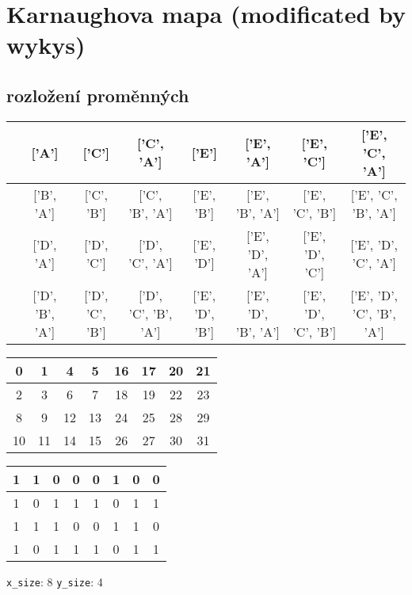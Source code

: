 \documentclass[a3paper]{article}
\begin{document}
\section{Karnaughova mapa (modificated by wykys)}
\subsection{rozložení proměnných}
\begin{tabular}[c]{| c | c | c | c | c | c | c | c |}

\hline
[]&['A']&['C']&['C', 'A']&['E']&['E', 'A']&['E', 'C']&['E', 'C', 'A']\\
\hline
['B']&['B', 'A']&['C', 'B']&['C', 'B', 'A']&['E', 'B']&['E', 'B', 'A']&['E', 'C', 'B']&['E', 'C', 'B', 'A']\\
\hline
['D']&['D', 'A']&['D', 'C']&['D', 'C', 'A']&['E', 'D']&['E', 'D', 'A']&['E', 'D', 'C']&['E', 'D', 'C', 'A']\\
\hline
['D', 'B']&['D', 'B', 'A']&['D', 'C', 'B']&['D', 'C', 'B', 'A']&['E', 'D', 'B']&['E', 'D', 'B', 'A']&['E', 'D', 'C', 'B']&['E', 'D', 'C', 'B', 'A']\\
\hline
\end{tabular}
\newline
\newline
\newline
\begin{tabular}[c]{| c | c | c | c | c | c | c | c |}

\hline
0&1&4&5&16&17&20&21\\
\hline
2&3&6&7&18&19&22&23\\
\hline
8&9&12&13&24&25&28&29\\
\hline
10&11&14&15&26&27&30&31\\
\hline
\end{tabular}
\newline
\newline
\newline
\begin{tabular}[c]{| c | c | c | c | c | c | c | c |}

\hline
1&1&0&0&0&1&0&0\\
\hline
1&0&1&1&1&0&1&1\\
\hline
1&1&1&0&0&1&1&0\\
\hline
1&0&1&1&1&0&1&1\\
\hline
\end{tabular}
\newline\newline
\verb|x_size|: 8
\newline
\verb|y_size|: 4
\end{document}
